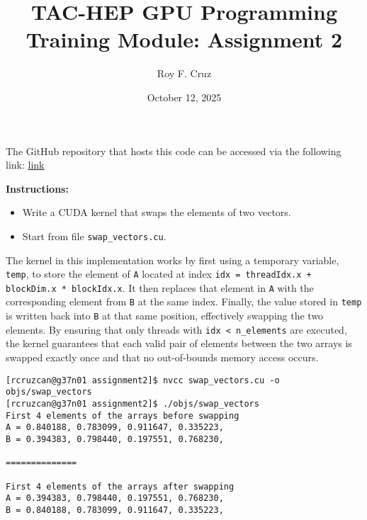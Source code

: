 \documentclass{article}
\title{
    TAC-HEP GPU Programming Training Module: Assignment 2
}
\author{Roy F. Cruz}
\newcounter{exercise}
\newenvironment{exr}[1]{%
    \refstepcounter{exercise}
    \begin{tcolorbox}[colback=blue!5!white, colframe=blue!75!black, title=Exercise \theexercise]
    \textbf{Instructions:} #1
    \end{tcolorbox}
    \vspace{1em}
}{}
\begin{document}
\date{October 12, 2025}
\maketitle

The GitHub repository that hosts this code can be accessed via the following link: \href{https://github.com/roy-cruz/TAC-HEP_GPU-Course_Assignments/tree/master}{link}

\begin{exr}{
    \begin{itemize}
        \item Write a CUDA kernel that swaps the elements of two vectors.
        \item Start from file \texttt{swap\_vectors.cu}.
    \end{itemize}
    }
\end{exr}

The kernel in this implementation works by first using a temporary variable, \texttt{temp}, to store the element of \texttt{A} located at index \texttt{idx = threadIdx.x + blockDim.x * blockIdx.x}. It then replaces that element in \texttt{A} with the corresponding element from \texttt{B} at the same index. Finally, the value stored in \texttt{temp} is written back into \texttt{B} at that same position, effectively swapping the two elements. By ensuring that only threads with \texttt{idx < n\_elements} are executed, the kernel guarantees that each valid pair of elements between the two arrays is swapped exactly once and that no out-of-bounds memory access occurs.



\begin{lstlisting}[style=output]
[rcruzcan@g37n01 assignment2]$ nvcc swap_vectors.cu -o objs/swap_vectors
[rcruzcan@g37n01 assignment2]$ ./objs/swap_vectors 
First 4 elements of the arrays before swapping
A = 0.840188, 0.783099, 0.911647, 0.335223, 
B = 0.394383, 0.798440, 0.197551, 0.768230, 

==============

First 4 elements of the arrays after swapping
A = 0.394383, 0.798440, 0.197551, 0.768230, 
B = 0.840188, 0.783099, 0.911647, 0.335223, 
\end{lstlisting}


\end{document}

